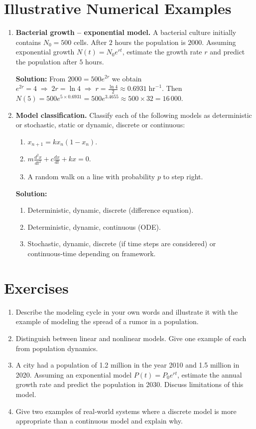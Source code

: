 \documentclass[12pt,a4paper]{book}
\begin{document}
\section{Illustrative Numerical Examples}
\begin{enumerate}[leftmargin=*, label=\textbf{Example 1.\arabic*}]
    \item \textbf{Bacterial growth – exponential model.}
    A bacterial culture initially contains $N_0 = 500$ cells. After $2$ hours the population is $2000$. Assuming exponential growth $N(t) = N_0 e^{rt}$, estimate the growth rate $r$ and predict the population after $5$ hours.

    \textbf{Solution:}
    From $2000 = 500 e^{2r}$ we obtain $e^{2r} = 4 \;\Rightarrow\; 2r = \ln 4 \;\Rightarrow\; r = \frac{\ln 4}{2} \approx 0.6931\;\text{hr}^{-1}$.
    Then $N(5) = 500 e^{5 \times 0.6931} = 500 e^{3.4655} \approx 500 \times 32 = 16\,000$.

    \item \textbf{Model classification.}
    Classify each of the following models as deterministic or stochastic, static or dynamic, discrete or continuous:
    \begin{enumerate}
        \item $x_{n+1} = k x_n (1 - x_n)$.
        \item $m \frac{d^2x}{dt^2} + c \frac{dx}{dt} + k x = 0$.
        \item A random walk on a line with probability $p$ to step right.
    \end{enumerate}
    \textbf{Solution:}
    \begin{enumerate}
        \item Deterministic, dynamic, discrete (difference equation).
        \item Deterministic, dynamic, continuous (ODE).
        \item Stochastic, dynamic, discrete (if time steps are considered) or continuous‑time depending on framework.
    \end{enumerate}
\end{enumerate}

\section{Exercises}
\begin{enumerate}[leftmargin=*, label=\textbf{Exercise 1.\arabic*}]
    \item Describe the modeling cycle in your own words and illustrate it with the example of modeling the spread of a rumor in a population.
    \item Distinguish between linear and nonlinear models. Give one example of each from population dynamics.
    \item A city had a population of 1.2 million in the year 2010 and 1.5 million in 2020. Assuming an exponential model $P(t)=P_0 e^{rt}$, estimate the annual growth rate and predict the population in 2030. Discuss limitations of this model.
    \item Give two examples of real‑world systems where a discrete model is more appropriate than a continuous model and explain why.
\end{enumerate}
\end{document}
